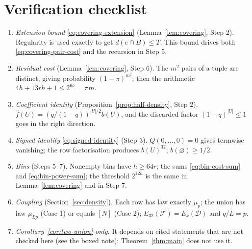 \documentclass[11pt,letterpaper]{article}
\theoremstyle{definition}
\theoremstyle{remark}
\numberwithin{equation}{section}
\begin{document}
\section{Verification checklist}

\begin{enumerate}
\item \emph{Extension bound} \eqref{eq:covering-extension}
(Lemma~\ref{lem:covering}, Step 2). Regularity is used exactly to get
$d(e\cap B)\le T$. This bound drives both
\eqref{eq:covering-pair-cost} and the recursion in Step 5.
\item \emph{Residual cost} (Lemma~\ref{lem:covering}, Step 6). The $m^2$
pairs of a tuple are distinct, giving probability $(1-\pi)^{m^2}$; then
the arithmetic $4h+13rh+1\le2^{6h}=\pi m$.
\item \emph{Coefficient identity}
(Proposition~\ref{prop:half-density}, Step 2).
$\widehat f(U)=(q/(1-q))^{|U|/2}b(U)$, and the discarded factor
$(1-q)^{|U|}\le1$ goes in the right direction.
\item \emph{Signed identity} \eqref{eq:signed-identity} (Step 3).
$Q(0,\ldots,0)=0$ gives termwise vanishing; the row factorisation
produces $b(U)^{32}$; $b(\varnothing)\ge1/2$.
\item \emph{Bins} (Steps 5--7). Nonempty bins have $h\ge64r$; the sums
\eqref{eq:bin-cost-sum} and \eqref{eq:bin-power-sum}; the threshold
$2^{12h}$ is the same in Lemma~\ref{lem:covering} and in Step 7.
\item \emph{Coupling} (Section~\ref{sec:density}). Each row has law
exactly $\mu_p$; the union has law $\mu_{Lp}$ (Case 1) or equals $[N]$
(Case 2); $E_{32}(\mathcal F)=E_k(\mathcal D)$ and $q/L=p$.
\item \emph{Corollary~\ref{cor:two-union} only.} It depends on cited
statements that are not checked here (see the boxed note);
Theorem~\ref{thm:main} does not use it.
\end{enumerate}
\end{document}
